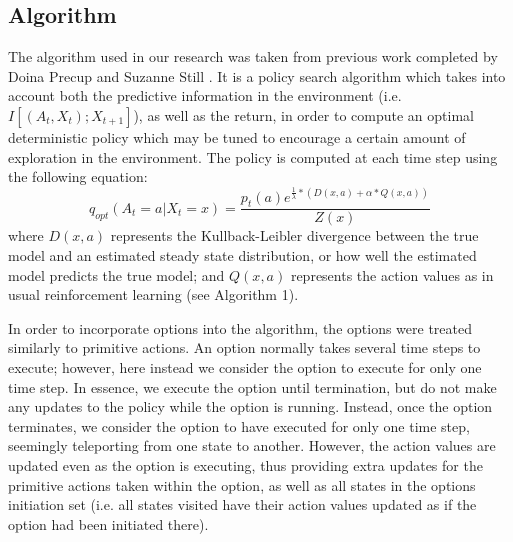 \documentclass{acm_proc_article-sp}
\begin{document}
\subsection{Algorithm} 

The algorithm used in our research was taken from previous work completed by Doina Precup and Suzanne Still \cite{still}. It is a policy search algorithm which takes into account both the predictive information in the environment (i.e. $I[(A_t,X_t); X_{t+1}]$), as well as the return, in order to compute an optimal deterministic policy which may be tuned to encourage a certain amount of exploration in the environment. The policy is computed at each time step using the following equation: $$q_{opt}(A_t = a| X_t = x) = \frac{p_t(a)e^{\frac{1}{\lambda}*(D(x,a) + \alpha*Q(x,a))}}{Z(x)}$$ where $D(x,a)$ represents the Kullback-Leibler divergence between the true model and an estimated steady state distribution, or how well the estimated model predicts the true model; and $Q(x,a)$ represents the action values as in usual reinforcement learning (see Algorithm 1).

In order to incorporate options into the algorithm, the options were treated similarly to primitive actions. An option normally takes several time steps to execute; however, here instead we consider the option to execute for only one time step. In essence, we execute the option until termination, but do not make any updates to the policy while the option is running. Instead, once the option terminates, we consider the option to have executed for only one time step, seemingly teleporting from one state to another. However, the action values are updated even as the option is executing, thus providing extra updates for the primitive actions taken within the option, as well as all states in the options initiation set (i.e. all states visited have their action values updated as if the option had been initiated there). 
\end{document}
